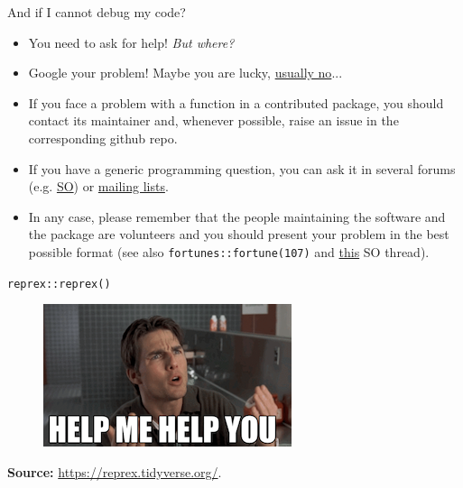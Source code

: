 \documentclass[
hyperref={bookmarks=false},
xcolor={dvipsnames,svgnames*,x11names*}, 
12pt
]{beamer}
\begin{document}
\begin{frame}{And if I cannot debug my code? }
\vspace{-0.5cm}
\begin{itemize}
\itemsep 2ex
\item You need to ask for help! \textit{But where?} 
\item Google your problem! Maybe you are lucky,  \href{https://imgs.xkcd.com/comics/wisdom_of_the_ancients.png}{usually no}... 
\item If you face a problem with a function in a contributed package, you should contact its maintainer and, whenever possible, raise an issue in the corresponding github repo. 
\item If you have a generic programming question, you can ask it in several forums (e.g. \href{https://stackoverflow.com/questions/tagged/r}{SO}) or \href{https://www.r-project.org/mail.html}{mailing lists}.
\item In any case, please remember that the people maintaining the software and the package are volunteers and you should present your problem in the best possible format (see also \texttt{fortunes::fortune(107)} and \href{https://stackoverflow.com/questions/5963269/how-to-make-a-great-r-reproducible-example}{this} SO thread). 
\end{itemize}
\end{frame}

\begin{frame}{\texttt{reprex::reprex()}}
\vspace{-0.5cm}
\begin{figure}
\centering
\includegraphics[width=\linewidth]{figures/reprex.png}
\end{figure}
\textbf{Source: } \url{https://reprex.tidyverse.org/}.
\end{frame}
\end{document}
